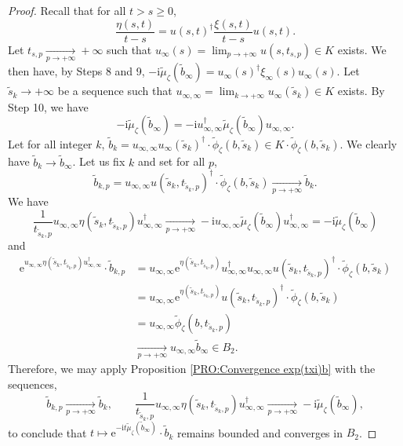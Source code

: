 \documentclass{article}
\theoremstyle{remark}
\theoremstyle{definition}
\newcommand{\tend}[2]{\underset{#1 \rightarrow #2}{\longrightarrow}}
\renewcommand{\i}{\boldsymbol{\mathrm{i}}}
\newcommand{\e}{\boldsymbol{\mathrm{e}}}
\renewcommand{\geq}{\geqslant}
\begin{document}
\begin{proof}
Recall that for all $t > s \geq 0$,
$$
\frac{\eta(s,t)}{t - s} = u(s,t)^\dagger\frac{\xi(s,t)}{t - s}u(s,t).
$$
Let $t_{s,p} \tend{p}{+\infty} +\infty$ such that $u_\infty(s) = \lim_{p \rightarrow +\infty} u(s,t_{s,p}) \in K$ exists. We then have, by Steps 8 and 9, $-\i\tilde{\mu}_\zeta(\tilde{b}_\infty) = u_\infty(s)^\dagger\xi_\infty(s)u_\infty(s)$. Let $\tilde{s}_k \rightarrow +\infty$ be a sequence such that $u_{\infty,\infty} = \lim_{k \rightarrow +\infty} u_\infty(\tilde{s}_k) \in K$ exists. By Step 10, we have
$$
-\i\tilde{\mu}_\zeta(\tilde{b}_\infty) = -\i u_{\infty,\infty}^\dagger\tilde{\mu}_\zeta(\tilde{b}_\infty)u_{\infty,\infty}.
$$
Let for all integer $k$, $\tilde{b}_k = u_{\infty,\infty}u_\infty(\tilde{s}_k)^\dagger \cdot \tilde{\phi}_\zeta(b,\tilde{s}_k) \in K \cdot \tilde{\phi}_\zeta(b,\tilde{s}_k)$. We clearly have $\tilde{b}_k \rightarrow \tilde{b}_\infty$. Let us fix $k$ and set for all $p$,
$$
\tilde{b}_{k,p} = u_{\infty,\infty}u(\tilde{s}_k,t_{\tilde{s}_k,p})^\dagger \cdot \tilde{\phi}_\zeta(b,\tilde{s}_k) \tend{p}{+\infty} \tilde{b}_k.
$$
We have
$$
\frac{1}{t_{\tilde{s}_k,p}}u_{\infty,\infty}\eta(\tilde{s}_k,t_{\tilde{s}_k,p})u_{\infty,\infty}^\dagger \tend{p}{+\infty} -\i u_{\infty,\infty}\tilde{\mu}_\zeta(\tilde{b}_\infty)u_{\infty,\infty}^\dagger = -\i\tilde{\mu}_\zeta(\tilde{b}_\infty)
$$
and
\begin{align*}
    \e^{u_{\infty,\infty}\eta(\tilde{s}_k,t_{\tilde{s}_k,p})u_{\infty,\infty}^\dagger} \cdot \tilde{b}_{k,p} & = u_{\infty,\infty}\e^{\eta(\tilde{s}_k,t_{\tilde{s}_k,p})}u_{\infty,\infty}^\dagger u_{\infty,\infty}u(\tilde{s}_k,t_{\tilde{s}_k,p})^\dagger \cdot \tilde{\phi}_\zeta(b,\tilde{s}_k)\\
    & = u_{\infty,\infty}\e^{\eta(\tilde{s}_k,t_{\tilde{s}_k,p})}u(\tilde{s}_k,t_{\tilde{s}_k,p})^\dagger \cdot \tilde{\phi}_\zeta(b,\tilde{s}_k)\\
    & = u_{\infty,\infty}\tilde{\phi}_\zeta(b,t_{\tilde{s}_k,p})\\
    & \tend{p}{+\infty} u_{\infty,\infty}\tilde{b}_\infty \in B_2.
\end{align*}
Therefore, we may apply Proposition \ref{PRO:Convergence exp(txi)b} with the sequences,
$$
\tilde{b}_{k,p} \tend{p}{+\infty} \tilde{b}_k, \qquad \frac{1}{t_{\tilde{s}_k,p}}u_{\infty,\infty}\eta(\tilde{s}_k,t_{\tilde{s}_k,p})u_{\infty,\infty}^\dagger \tend{p}{+\infty} -\i\tilde{\mu}_\zeta(\tilde{b}_\infty),
$$
to conclude that $t \mapsto \e^{-\i t\tilde{\mu}_\zeta(\tilde{b}_\infty)} \cdot \tilde{b}_k$ remains bounded and converges in $B_2$.
\end{proof}
\end{document}
